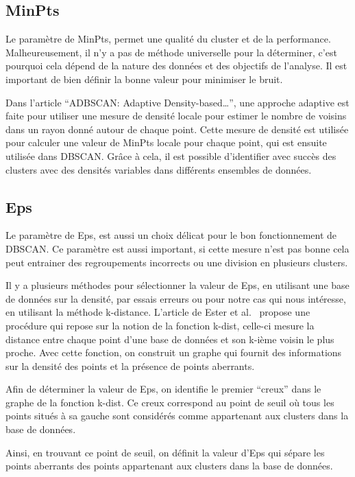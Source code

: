 \documentclass[
  oneside]{memoire-umons}
\begin{document}
\hypertarget{minpts}{%
\subsection{MinPts}\label{minpts}}

Le paramètre de MinPts, permet une qualité du cluster et de la
performance. Malheureusement, il n'y a pas de méthode universelle pour
la déterminer, c'est pourquoi cela dépend de la nature des données et
des objectifs de l'analyse. Il est important de bien définir la bonne
valeur pour minimiser le bruit.

Dans l'article ``ADBSCAN: Adaptive Density-based\ldots{}'', une approche
adaptive est faite pour utiliser une mesure de densité locale pour
estimer le nombre de voisins dans un rayon donné autour de chaque point.
Cette mesure de densité est utilisée pour calculer une valeur de MinPts
locale pour chaque point, qui est ensuite utilisée dans DBSCAN. Grâce à
cela, il est possible d'identifier avec succès des clusters avec des
densités variables dans différents ensembles de données.

\hypertarget{eps}{%
\subsection{Eps}\label{eps}}

Le paramètre de Eps, est aussi un choix délicat pour le bon
fonctionnement de DBSCAN. Ce paramètre est aussi important, si cette
mesure n'est pas bonne cela peut entrainer des regroupements incorrects
ou une division en plusieurs clusters.

Il y a plusieurs méthodes pour sélectionner la valeur de Eps, en
utilisant une base de données sur la densité, par essais erreurs ou pour
notre cas qui nous intéresse, en utilisant la méthode k-distance.
L'article de Ester et al.~ propose une procédure qui
repose sur la notion de la fonction k-dist, celle-ci mesure la distance
entre chaque point d'une base de données et son k-ième voisin le plus
proche. Avec cette fonction, on construit un graphe qui fournit des
informations sur la densité des points et la présence de points
aberrants.

Afin de déterminer la valeur de Eps, on identifie le premier ``creux''
dans le graphe de la fonction k-dist. Ce creux correspond au point de
seuil où tous les points situés à sa gauche sont considérés comme
appartenant aux clusters dans la base de données.

Ainsi, en trouvant ce point de seuil, on définit la valeur d'Eps qui
sépare les points aberrants des points appartenant aux clusters dans la
base de données.
\end{document}
